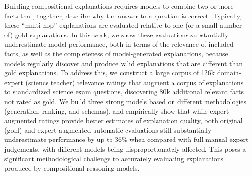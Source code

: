 Building compositional explanations requires models to combine two or more facts that, together, describe why the answer to a question is correct.  Typically, these ``multi-hop'' explanations are evaluated relative to one (or a small number of) gold explanations.  In this work, we show these evaluations substantially underestimate model performance, both in terms of the relevance of included facts, as well as the completeness of model-generated explanations, because models regularly discover and produce valid explanations that are different than gold explanations.  To address this, we construct a large corpus of 126k domain-expert (science teacher) relevance ratings that augment a corpus of explanations to standardized science exam questions, discovering 80k additional relevant facts not rated as gold.  We build three strong models based on different methodologies (generation, ranking, and schemas), and empirically show that while expert-augmented ratings provide better estimates of explanation quality, both original (gold) and expert-augmented automatic evaluations still substantially underestimate performance by up to 36\% when compared with full manual expert judgements, with different models being disproportionately affected. This poses a significant methodological challenge to accurately evaluating explanations produced by compositional reasoning models.
